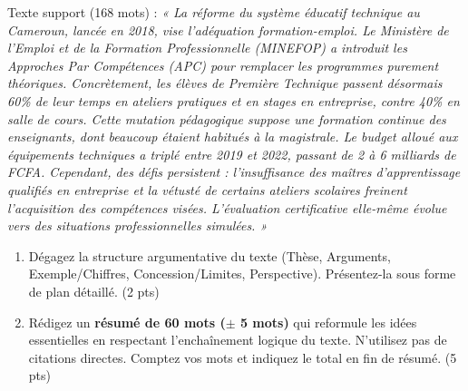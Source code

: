 \documentclass[11pt]{article}
\begin{document}
\begin{exercice}
\label{exo:resume}
Texte support (168 mots) : \textit{« La réforme du système éducatif technique au Cameroun, lancée en 2018, vise l'adéquation formation-emploi. Le Ministère de l'Emploi et de la Formation Professionnelle (MINEFOP) a introduit les Approches Par Compétences (APC) pour remplacer les programmes purement théoriques. Concrètement, les élèves de Première Technique passent désormais 60\% de leur temps en ateliers pratiques et en stages en entreprise, contre 40\% en salle de cours. Cette mutation pédagogique suppose une formation continue des enseignants, dont beaucoup étaient habitués à la magistrale. Le budget alloué aux équipements techniques a triplé entre 2019 et 2022, passant de 2 à 6 milliards de FCFA. Cependant, des défis persistent : l'insuffisance des maîtres d'apprentissage qualifiés en entreprise et la vétusté de certains ateliers scolaires freinent l'acquisition des compétences visées. L'évaluation certificative elle-même évolue vers des situations professionnelles simulées. »}

\begin{enumerate}
    \item Dégagez la structure argumentative du texte (Thèse, Arguments, Exemple/Chiffres, Concession/Limites, Perspective). Présentez-la sous forme de plan détaillé. (2 pts)
    \item Rédigez un \textbf{résumé de 60 mots ($\pm$ 5 mots)} qui reformule les idées essentielles en respectant l'enchaînement logique du texte. N'utilisez pas de citations directes. Comptez vos mots et indiquez le total en fin de résumé. (5 pts)
\end{enumerate}
\end{exercice}
\end{document}
